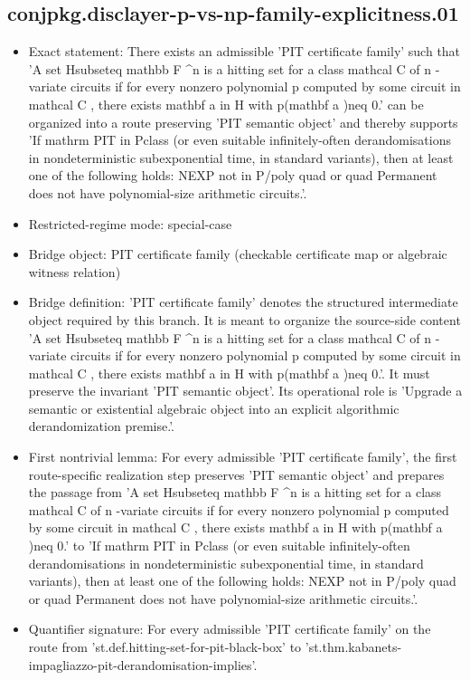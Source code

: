 \documentclass[11pt]{article}
\begin{document}
\subsection*{conjpkg.disclayer-p-vs-np-family-explicitness.01}
\begin{itemize}
\item Exact statement: There exists an admissible 'PIT certificate family' such that 'A set Hsubseteq mathbb F \textasciicircum{}n is a hitting set for a class mathcal C of n -variate circuits if for every nonzero polynomial p computed by some circuit in mathcal C , there exists mathbf a in H with p(mathbf a )neq 0.' can be organized into a route preserving 'PIT semantic object' and thereby supports 'If mathrm PIT in Pclass (or even suitable infinitely-often derandomisations in nondeterministic subexponential time, in standard variants), then at least one of the following holds: NEXP not in P/poly quad or quad Permanent does not have polynomial-size arithmetic circuits.'.
\item Restricted-regime mode: special-case
\item Bridge object: PIT certificate family (checkable certificate map or algebraic witness relation)
\item Bridge definition: 'PIT certificate family' denotes the structured intermediate object required by this branch. It is meant to organize the source-side content 'A set Hsubseteq mathbb F \textasciicircum{}n is a hitting set for a class mathcal C of n -variate circuits if for every nonzero polynomial p computed by some circuit in mathcal C , there exists mathbf a in H with p(mathbf a )neq 0.'. It must preserve the invariant 'PIT semantic object'. Its operational role is 'Upgrade a semantic or existential algebraic object into an explicit algorithmic derandomization premise.'.
\item First nontrivial lemma: For every admissible 'PIT certificate family', the first route-specific realization step preserves 'PIT semantic object' and prepares the passage from 'A set Hsubseteq mathbb F \textasciicircum{}n is a hitting set for a class mathcal C of n -variate circuits if for every nonzero polynomial p computed by some circuit in mathcal C , there exists mathbf a in H with p(mathbf a )neq 0.' to 'If mathrm PIT in Pclass (or even suitable infinitely-often derandomisations in nondeterministic subexponential time, in standard variants), then at least one of the following holds: NEXP not in P/poly quad or quad Permanent does not have polynomial-size arithmetic circuits.'.
\item Quantifier signature: For every admissible 'PIT certificate family' on the route from 'st.def.hitting-set-for-pit-black-box' to 'st.thm.kabanets-impagliazzo-pit-derandomisation-implies'.

\end{itemize}
\end{document}
